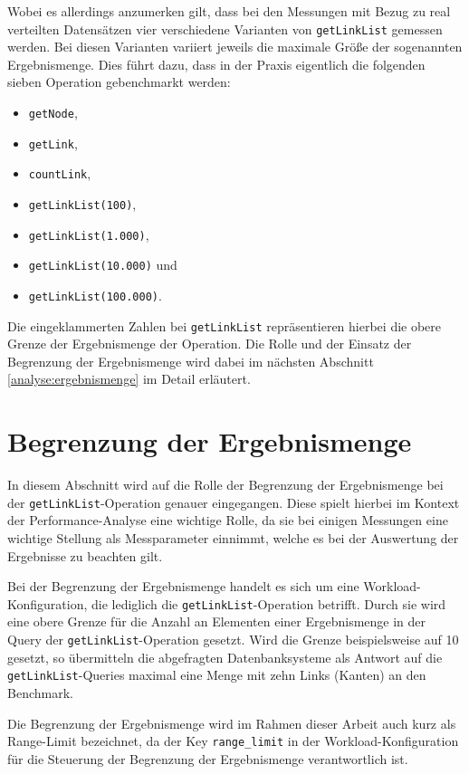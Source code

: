 Wobei es allerdings anzumerken gilt, dass bei den Messungen mit Bezug zu real verteilten Datensätzen vier verschiedene Varianten von \texttt{getLinkList} gemessen werden. Bei diesen Varianten variiert jeweils die maximale Größe der sogenannten Ergebnismenge. Dies führt dazu, dass in der Praxis eigentlich die folgenden sieben Operation gebenchmarkt werden:
\begin{itemize}
    \item \texttt{getNode},
    \item \texttt{getLink},
    \item \texttt{countLink},
    \item \texttt{getLinkList(100)},
    \item \texttt{getLinkList(1.000)},
    \item \texttt{getLinkList(10.000)} und
    \item \texttt{getLinkList(100.000)}.
\end{itemize}
Die eingeklammerten Zahlen bei \texttt{getLinkList} repräsentieren hierbei die obere Grenze der Ergebnismenge der Operation. Die Rolle und der Einsatz der Begrenzung der Ergebnismenge wird dabei im nächsten Abschnitt \autoref{analyse:ergebnismenge} im Detail erläutert. 

\section{Begrenzung der Ergebnismenge}
\label{analyse:ergebnismenge}
In diesem Abschnitt wird auf die Rolle der Begrenzung der Ergebnismenge bei der \texttt{getLinkList}-Operation genauer eingegangen. Diese spielt hierbei im Kontext der Performance-Analyse eine wichtige Rolle, da sie bei einigen Messungen eine wichtige Stellung als Messparameter einnimmt, welche es bei der Auswertung der Ergebnisse zu beachten gilt. 

Bei der Begrenzung der Ergebnismenge handelt es sich um eine Workload-Konfiguration, die lediglich die \texttt{getLinkList}-Operation betrifft. Durch sie wird eine obere Grenze für die Anzahl an Elementen einer Ergebnismenge in der Query der \texttt{getLinkList}-Operation gesetzt. Wird die Grenze beispielsweise auf 10 gesetzt, so übermitteln die abgefragten Datenbanksysteme als Antwort auf die \texttt{getLinkList}-Queries maximal eine Menge mit zehn Links (Kanten) an den Benchmark. 

Die Begrenzung der Ergebnismenge wird im Rahmen dieser Arbeit auch kurz als Range-Limit bezeichnet, da der Key \texttt{range\_limit} in der Workload-Konfiguration für die Steuerung der Begrenzung der Ergebnismenge verantwortlich ist.

